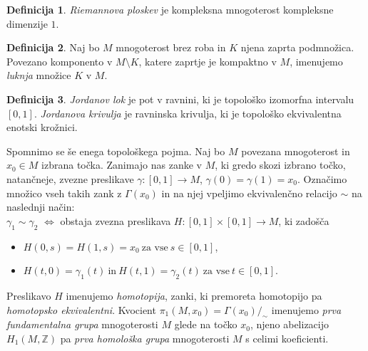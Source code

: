 \documentclass[12pt,a4paper,twoside]{article}
\theoremstyle{definition} %
\newtheorem{definicija}{Definicija}[section]
\theoremstyle{plain} %
\numberwithin{equation}{section}  %
\begin{document}
\begin{definicija}
\emph{Riemannova ploskev} je kompleksna mnogoterost kompleksne dimenzije $1$.
\end{definicija}

\begin{definicija}
Naj bo $M$ mnogoterost brez roba in $K$ njena zaprta podmnožica. Povezano komponento v $M \setminus K$, katere zaprtje je kompaktno v $M$, imenujemo \emph{luknja} množice $K$ v $M$.
\end{definicija}

\begin{definicija}
\emph{Jordanov lok} je pot v ravnini, ki je topološko izomorfna intervalu $[0,1]$.
\emph{Jordanova krivulja} je ravninska krivulja, ki je topološko ekvivalentna enotski krožnici.
\end{definicija}

Spomnimo se še enega topološkega pojma. Naj bo $M$ povezana mnogoterost in $x_{0} \in M$ izbrana točka. Zanimajo nas zanke v $M$, ki gredo skozi izbrano točko, natančneje, zvezne preslikave $\gamma \colon [0,1] \to M$, $\gamma(0) = \gamma(1) = x_{0}$. Označimo množico vseh takih zank z $\Gamma(x_{0})$ in na njej vpeljimo ekvivalenčno relacijo $\sim$ na naslednji način:\\[0.3cm]
$\gamma_{1} \sim \gamma_{2}$ $\iff$ obstaja zvezna preslikava $H \colon [0,1] \times [0,1] \to M$, ki zadošča 
\begin{itemize}
\item $H(0,s) = H(1,s) = x_{0} \ \text{za vse} \ s \in [0,1]$, 
\item $H(t,0) = \gamma_{1}(t) \ \text{in} \ H(t,1) = \gamma_{2}(t) \ \text{za vse} \ t \in [0,1]$.
\end{itemize}
Preslikavo $H$ imenujemo \emph{homotopija}, zanki, ki premoreta homotopijo pa \emph{homotopsko ekvivalentni}.
Kvocient $\pi_{1}(M,x_{0}) = \Gamma(x_{0}) / _{\sim}$ imenujemo \emph{prva fundamentalna grupa} mnogoterosti $M$ glede na točko $x_{0}$, njeno abelizacijo $H_{1}(M, \mathbb{Z})$ pa \emph{prva homološka grupa} mnogoterosti $M$ s celimi koeficienti.

\end{document}
